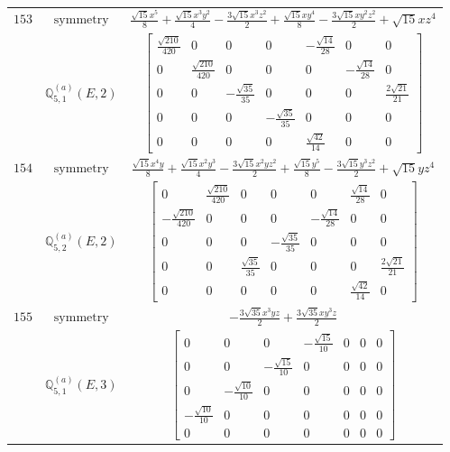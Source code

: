 \documentclass[fleqn,8pt,landscape]{jsarticle}
\begin{document}
\begin{longtable}{ccc}
$ 153 $ & $ \text{symmetry} $ & $ \frac{\sqrt{15} x^{5}}{8} + \frac{\sqrt{15} x^{3} y^{2}}{4} - \frac{3 \sqrt{15} x^{3} z^{2}}{2} + \frac{\sqrt{15} x y^{4}}{8} - \frac{3 \sqrt{15} x y^{2} z^{2}}{2} + \sqrt{15} x z^{4} $ \\
$  $ & $ \mathbb{Q}_{5,1}^{(a)}(E,2) $ & $ \begin{bmatrix} \frac{\sqrt{210}}{420} & 0 & 0 & 0 & - \frac{\sqrt{14}}{28} & 0 & 0 \\ 0 & \frac{\sqrt{210}}{420} & 0 & 0 & 0 & - \frac{\sqrt{14}}{28} & 0 \\ 0 & 0 & - \frac{\sqrt{35}}{35} & 0 & 0 & 0 & \frac{2 \sqrt{21}}{21} \\ 0 & 0 & 0 & - \frac{\sqrt{35}}{35} & 0 & 0 & 0 \\ 0 & 0 & 0 & 0 & \frac{\sqrt{42}}{14} & 0 & 0 \end{bmatrix} $ \\ \hline
$ 154 $ & $ \text{symmetry} $ & $ \frac{\sqrt{15} x^{4} y}{8} + \frac{\sqrt{15} x^{2} y^{3}}{4} - \frac{3 \sqrt{15} x^{2} y z^{2}}{2} + \frac{\sqrt{15} y^{5}}{8} - \frac{3 \sqrt{15} y^{3} z^{2}}{2} + \sqrt{15} y z^{4} $ \\
$  $ & $ \mathbb{Q}_{5,2}^{(a)}(E,2) $ & $ \begin{bmatrix} 0 & \frac{\sqrt{210}}{420} & 0 & 0 & 0 & \frac{\sqrt{14}}{28} & 0 \\ - \frac{\sqrt{210}}{420} & 0 & 0 & 0 & - \frac{\sqrt{14}}{28} & 0 & 0 \\ 0 & 0 & 0 & - \frac{\sqrt{35}}{35} & 0 & 0 & 0 \\ 0 & 0 & \frac{\sqrt{35}}{35} & 0 & 0 & 0 & \frac{2 \sqrt{21}}{21} \\ 0 & 0 & 0 & 0 & 0 & \frac{\sqrt{42}}{14} & 0 \end{bmatrix} $ \\ \hline
$ 155 $ & $ \text{symmetry} $ & $ - \frac{3 \sqrt{35} x^{3} y z}{2} + \frac{3 \sqrt{35} x y^{3} z}{2} $ \\
$  $ & $ \mathbb{Q}_{5,1}^{(a)}(E,3) $ & $ \begin{bmatrix} 0 & 0 & 0 & - \frac{\sqrt{15}}{10} & 0 & 0 & 0 \\ 0 & 0 & - \frac{\sqrt{15}}{10} & 0 & 0 & 0 & 0 \\ 0 & - \frac{\sqrt{10}}{10} & 0 & 0 & 0 & 0 & 0 \\ - \frac{\sqrt{10}}{10} & 0 & 0 & 0 & 0 & 0 & 0 \\ 0 & 0 & 0 & 0 & 0 & 0 & 0 \end{bmatrix} $ \\ \hline

\end{longtable}
\end{document}
